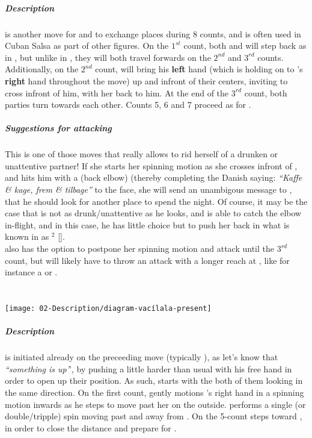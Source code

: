 \subparagraph*{Description}
\Sovsenchufla is another move for \dude and \gal to exchange places during 8 counts, and is often used in Cuban Salsa as part of other figures. On the $1^{st}$ count, both \dude and \gal will step back as in \sovsguapea, but unlike in \sovsguapea, they will both travel forwards on the $2^{nd}$ and $3^{rd}$ counts. Additionally, on the $2^{nd}$ count, \dude will bring his \textbf{left} hand (which is holding on to \gal's \textbf{right} hand throughout the move) up and infront of their centers, inviting \gal to cross infront of him, with her back to him. At the end of the $3^{rd}$ count, both parties turn towards each other. Counts 5, 6 and 7 proceed as for \sovsguapea. 
\subparagraph*{Suggestions for attacking}
This is one of those moves that really allows \gal to rid herself of a drunken or unattentive partner! If she starts her spinning motion as she crosses infront of \dude, and hits him with a \attkaffekage (back elbow) (thereby completing the Danish saying: \textit{``Kaffe \& kage, frem \& tilbage''} to the face, she will send an unambigous message to \dude, that he should look for another place to spend the night. Of course, it may be the case that \dude is not as drunk/unattentive as he looks, and is able to catch the elbow in-flight, and in this case, he has little choice but to push her back in what is known in \sovs as \sovsenchufla$^{2}$ []. \\
\gal also has the option to postpone her spinning motion and attack until the $3^{rd}$ count, but will likely have to throw an attack with a longer reach at \dude, like for instance a \attbagknytter or \attsideaxe.


\pagebreak{}
\section*{\Sovsvacilala [\Salsavacilala]}
\begin{center}
\texttt{[image: 02-Description/diagram-vacílala-present]}
\end{center}
\subparagraph*{Description }
\Sovsvacilala is initiated already on the preceeding move (typically \sovsguapea), as \dude let's \gal know that \textit{``something is up'}', by pushing a little harder than usual with his free hand in order to open up their position. As such, \sovsvacilala starts with the both of them looking in the same direction.
On the first count, \dude gently motions \gal's right hand in a spinning motion inwards as he steps to move past her on the outside. \gal performs a single (or double/tripple) spin moving past and away from \dude. 
On the 5-count \dude steps toward \gal, in order to close the distance and prepare for \sovsdile.

